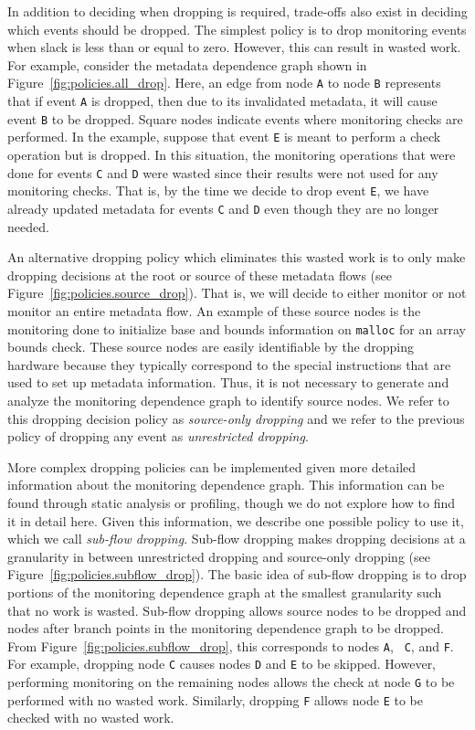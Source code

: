 In addition to deciding when dropping is required, trade-offs also exist in
deciding which events should be dropped.  The simplest policy is to drop 
monitoring events when slack is less than or equal to zero.  However, this can
result in wasted work. For example, consider the metadata dependence graph
shown in Figure~\ref{fig:policies.all_drop}. Here, an edge from node {\tt A} to
node {\tt B} represents that if event {\tt A} is dropped, then due to its
invalidated metadata, it will cause event {\tt B} to be dropped. Square nodes
indicate events where monitoring checks are performed. In the example, suppose
that event {\tt E} is meant to perform a check operation but is dropped.  In
this situation, the monitoring operations that were done for events {\tt C} and
{\tt D} were wasted since their results were not used for any monitoring
checks.  That is, by the time we decide to drop event {\tt E}, we have already
updated metadata for events {\tt C} and {\tt D} even though they are no longer
needed.

An alternative dropping policy which eliminates this wasted work is to only
make dropping decisions at the root or source of these metadata flows (see Figure~\ref{fig:policies.source_drop}). That is,
we will decide to either monitor or not monitor an entire metadata flow. An
example of these source nodes is the monitoring done to initialize base and
bounds information on {\tt malloc} for an array bounds check. These source
nodes are easily identifiable by the dropping hardware because they typically
correspond to the special instructions that are used to set up metadata
information. Thus, it is not necessary to generate and analyze the monitoring
dependence graph to identify source nodes. We refer to this dropping decision
policy as \emph{source-only
dropping} and we refer to the previous policy of dropping any event as
\emph{unrestricted dropping}.

More complex dropping policies can be implemented given more detailed
information about the monitoring dependence graph. This information can be
found through static analysis or profiling, though we do not explore how to
find it in detail here. Given this information, we describe one possible
policy to use it, which we call \emph{sub-flow dropping}. Sub-flow dropping makes
dropping decisions at a granularity in between unrestricted dropping and
source-only dropping (see Figure~\ref{fig:policies.subflow_drop}). 
The basic idea of sub-flow dropping is to drop portions of the monitoring
dependence graph at the smallest granularity such that no work is wasted.
Sub-flow dropping allows source nodes to be dropped and nodes after branch
points in the monitoring dependence graph to be dropped. From
Figure~\ref{fig:policies.subflow_drop}, this corresponds to nodes {\tt A}, {\tt
C}, and {\tt F}. For example,
dropping node {\tt C} causes nodes {\tt D} and {\tt E} to be skipped. However,
performing monitoring on the remaining nodes allows the check at node {\tt G}
to be performed with no wasted work. Similarly, dropping {\tt F} allows node
{\tt E} to be checked with no wasted work.

